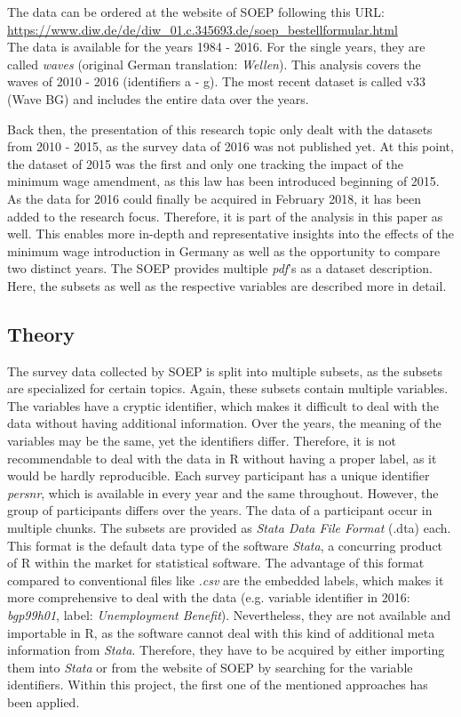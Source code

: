 \documentclass[a4paper]{article}
\begin{document}
The data can be ordered at the website of SOEP following this URL:\\
\url{https://www.diw.de/de/diw_01.c.345693.de/soep_bestellformular.html}\\
The data is available for the years 1984 - 2016. For the single years, they are called \textit{waves} (original German translation: \textit{Wellen}). This analysis covers the waves of 2010 - 2016 (identifiers a - g). The most recent dataset is called v33 (Wave BG) and includes the entire data over the years.

Back then, the presentation of this research topic only dealt with the datasets from 2010 - 2015, as the survey data of 2016 was not published yet. At this point, the dataset of 2015 was the first and only one tracking the impact of the minimum wage amendment, as this law has been introduced beginning of 2015. As the data for 2016 could finally be acquired in February 2018, it has been added to the research focus. Therefore, it is part of the analysis in this paper as well. This enables more in-depth and representative insights into the effects of the minimum wage introduction in Germany as well as the opportunity to compare two distinct years. The SOEP provides multiple \textit{pdf}'s as a dataset description. Here, the subsets as well as the respective variables are described more in detail.

\subsection{Theory}
The survey data collected by SOEP is split into multiple subsets, as the subsets are specialized for certain topics. Again, these subsets contain multiple variables. The variables have a cryptic identifier, which makes it difficult to deal with the data without having additional information. Over the years, the meaning of the variables may be the same, yet the identifiers differ. Therefore, it is not recommendable to deal with the data in R without having a proper label, as it would be hardly reproducible. Each survey participant has a unique identifier \textit{persnr}, which is available in every year and the same throughout. However, the group of participants differs over the years. The data of a participant occur in multiple chunks.  \newline \newline
The subsets are provided as \textit{Stata Data File Format} (.dta) each. This format is the default data type of the software \textit{Stata}, a concurring product of R within the market for statistical software. The advantage of this format compared to conventional files like \textit{.csv} are the embedded labels, which makes it more comprehensive to deal with the data (e.g. variable identifier in 2016: \textit{bgp99h01}, label: \textit{Unemployment Benefit}). Nevertheless, they are not available and importable in R, as the software cannot deal with this kind of additional meta information from \textit{Stata}. Therefore, they have to be acquired by either importing them into \textit{Stata} or from the website of SOEP by searching for the variable identifiers. Within this project, the first one of the mentioned approaches has been applied.
\end{document}
